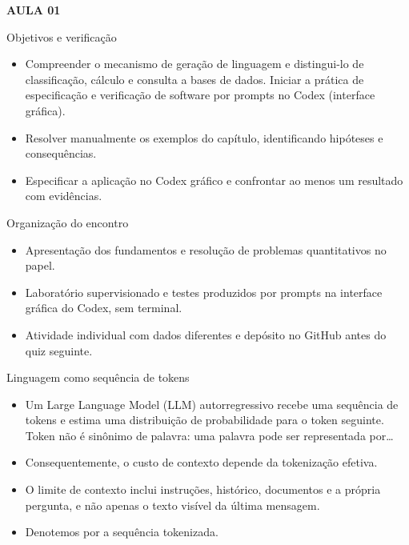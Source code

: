 \documentclass[10pt,aspectratio=169]{beamer}
\begin{document}
\begin{frame}[t]{}
\vspace{14mm}\textcolor{InsperRed}{\bfseries AULA 01}\par\vspace{4mm}{\LARGE\bfseries Fundamentos dos Large Language Models}\par\vspace{6mm}{\large Marketing Analítico}\par{}
\end{frame}

\begin{frame}[t]{Objetivos e verificação}
\small
\begin{itemize}
\item Compreender o mecanismo de geração de linguagem e distingui-lo de classificação, cálculo e consulta a bases de dados. Iniciar a prática de especificação e verificação de software por prompts no Codex (interface gráfica).
\item Resolver manualmente os exemplos do capítulo, identificando hipóteses e consequências.
\item Especificar a aplicação no Codex gráfico e confrontar ao menos um resultado com evidências.
\end{itemize}
\end{frame}

\begin{frame}[t]{Organização do encontro}
\small
\begin{itemize}
\item Apresentação dos fundamentos e resolução de problemas quantitativos no papel.
\item Laboratório supervisionado e testes produzidos por prompts na interface gráfica do Codex, sem terminal.
\item Atividade individual com dados diferentes e depósito no GitHub antes do quiz seguinte.
\end{itemize}
\end{frame}

\begin{frame}[t]{Linguagem como sequência de tokens}
\small
\begin{itemize}
\item Um Large Language Model (LLM) autorregressivo recebe uma sequência de tokens e estima uma distribuição de probabilidade para o token seguinte. Token não é sinônimo de palavra: uma palavra pode ser representada por…
\item Consequentemente, o custo de contexto depende da tokenização efetiva.
\item O limite de contexto inclui instruções, histórico, documentos e a própria pergunta, e não apenas o texto visível da última mensagem.
\item Denotemos por a sequência tokenizada.
\end{itemize}
\end{frame}
\end{document}
